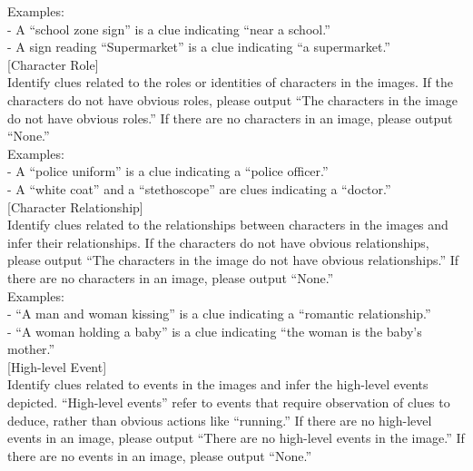 \begin{figure*}[hbt!]
\begin{center}
\begin{tcolorbox}
            Examples:  \\
            - A ``school zone sign'' is a clue indicating ``near a school.''  \\
            - A sign reading ``Supermarket'' is a clue indicating ``a supermarket.''  \\
            
            [Character Role]  \\
            Identify clues related to the roles or identities of characters in the images. If the characters do not have obvious roles, please output ``The characters in the image do not have obvious roles.'' If there are no characters in an image, please output ``None.''  \\
            
            Examples:  \\
            - A ``police uniform'' is a clue indicating a ``police officer.''  \\
            - A ``white coat'' and a ``stethoscope'' are clues indicating a ``doctor.''  \\
            
            [Character Relationship]  \\
            Identify clues related to the relationships between characters in the images and infer their relationships. If the characters do not have obvious relationships, please output ``The characters in the image do not have obvious relationships.'' If there are no characters in an image, please output ``None.''  \\
            
            Examples:  \\
            - ``A man and woman kissing'' is a clue indicating a ``romantic relationship.''  \\
            - ``A woman holding a baby'' is a clue indicating ``the woman is the baby's mother.''  \\
            
            [High-level Event]  \\
            Identify clues related to events in the images and infer the high-level events depicted. ``High-level events'' refer to events that require observation of clues to deduce, rather than obvious actions like ``running.'' If there are no high-level events in an image, please output ``There are no high-level events in the image.'' If there are no events in an image, please output ``None.''  \\
            

\end{tcolorbox}
\end{center}
\end{figure*}
